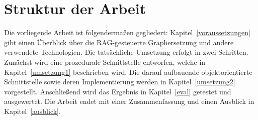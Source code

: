 \section{Struktur der Arbeit}

Die vorliegende Arbeit ist folgendermaßen gegliedert: Kapitel~\ref{voraussetzungen} gibt einen Überblick über die RAG-gesteuerte Graphersetzung und andere verwendete Technologien. Die tatsächliche Umsetzung erfolgt in zwei Schritten. Zunächst wird eine prozedurale Schnittstelle entworfen, welche in Kapitel~\ref{umsetzung1} beschrieben wird. Die darauf aufbauende objektorientierte Schnittstelle sowie deren Implementierung werden in Kapitel~\ref{umsetzung2} vorgestellt. Anschließend wird das Ergebnis in Kapitel~\ref{eval} getestet und ausgewertet. Die Arbeit endet mit einer Zusammenfassung und einen Ausblick in Kapitel~\ref{ausblick}.
